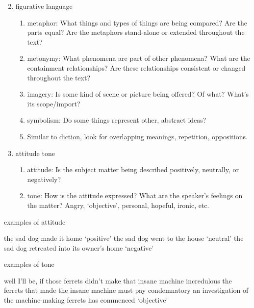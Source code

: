 \documentclass[12pt]{article}
\begin{document}
\begin{enumerate}
\setcounter{enumi}{1}
\item figurative language
    \begin{enumerate}
    \item metaphor: What things and types of things are being compared? Are the parts equal? Are the metaphors stand-alone or extended throughout the text?
    \item metonymy: What phenomena are part of other phenomena? What are the containment relationships? Are these relationships consistent or changed throughout the text?
    \item imagery: Is some kind of scene or picture being offered? Of what? What’s its scope/import?
    \item symbolism: Do some things represent other, abstract ideas?
    \item Similar to diction, look for overlapping meanings, repetition, oppositions.
    \end{enumerate}
\item attitude tone
    \begin{enumerate}
    \item attitude: Is the subject matter being described positively, neutrally, or negatively?
    \item tone: How is the attitude expressed? What are the speaker’s feelings on the matter? Angry, `objective', personal, hopeful, ironic, etc.
    \end{enumerate}
\end{enumerate}

\begin{exe}
\ex examples of attitude
    \begin{xlist}
    \ex the sad dog made it home \hfill `positive'
    \ex the sad dog went to the house \hfill `neutral'
    \ex the sad dog retreated into its owner’s home \hfill `negative'
    \end{xlist}
\ex examples of tone
    \begin{xlist}
    \ex well I'll be, if those ferrets didn’t make that insane machine \hfill incredulous
    \ex the ferrets that made the insane machine must pay \hfill condemnatory
    \ex an investigation of the machine-making ferrets has commenced \hfill `objective'
    \end{xlist}
\end{exe}
\end{document}
